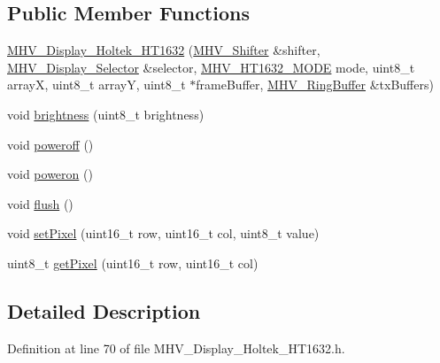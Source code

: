\subsection*{\-Public \-Member \-Functions}
\begin{DoxyCompactItemize}
\item 
\hyperlink{class_m_h_v___display___holtek___h_t1632_a584fae17d4902a8464a30f3b06e86811}{\-M\-H\-V\-\_\-\-Display\-\_\-\-Holtek\-\_\-\-H\-T1632} (\hyperlink{class_m_h_v___shifter}{\-M\-H\-V\-\_\-\-Shifter} \&shifter, \hyperlink{class_m_h_v___display___selector}{\-M\-H\-V\-\_\-\-Display\-\_\-\-Selector} \&selector, \hyperlink{_m_h_v___display___holtek___h_t1632_8h_a49097ad6362d784be39f7e83f5359011}{\-M\-H\-V\-\_\-\-H\-T1632\-\_\-\-M\-O\-D\-E} mode, uint8\-\_\-t array\-X, uint8\-\_\-t array\-Y, uint8\-\_\-t $\ast$frame\-Buffer, \hyperlink{class_m_h_v___ring_buffer}{\-M\-H\-V\-\_\-\-Ring\-Buffer} \&tx\-Buffers)
\item 
void \hyperlink{class_m_h_v___display___holtek___h_t1632_a60620705276f1713dead13a4b440fed4}{brightness} (uint8\-\_\-t brightness)
\item 
void \hyperlink{class_m_h_v___display___holtek___h_t1632_a224e7f735441e8d381fb6148f2b64dda}{poweroff} ()
\item 
void \hyperlink{class_m_h_v___display___holtek___h_t1632_a2a9586d4c16483b4223a2fad453bc6bf}{poweron} ()
\item 
void \hyperlink{class_m_h_v___display___holtek___h_t1632_aeeb460d8c5ba0d8d43fb18779e50258e}{flush} ()
\item 
void \hyperlink{class_m_h_v___display___holtek___h_t1632_a664e9a5744bed3fa50a6adc9fcf80206}{set\-Pixel} (uint16\-\_\-t row, uint16\-\_\-t col, uint8\-\_\-t value)
\item 
uint8\-\_\-t \hyperlink{class_m_h_v___display___holtek___h_t1632_a32fe510b3bfa55a32e02a9570e67639d}{get\-Pixel} (uint16\-\_\-t row, uint16\-\_\-t col)
\end{DoxyCompactItemize}


\subsection{\-Detailed \-Description}


\-Definition at line 70 of file \-M\-H\-V\-\_\-\-Display\-\_\-\-Holtek\-\_\-\-H\-T1632.\-h.



